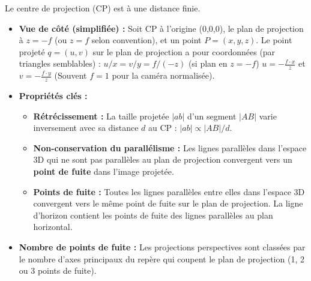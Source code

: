 \documentclass{article}
\begin{document}
Le centre de projection (CP) est à une distance finie.
\begin{itemize}
    \item \textbf{Vue de côté (simplifiée) :}
        Soit CP à l'origine (0,0,0), le plan de projection à $z = -f$ (ou $z=f$ selon convention), et un point $P=(x, y, z)$. Le point projeté $q=(u, v)$ sur le plan de projection a pour coordonnées (par triangles semblables) :
        $u / x = v / y = f / (-z)$ (si plan en $z=-f$)
        $u = - \frac{f \cdot x}{z}$ et $v = - \frac{f \cdot y}{z}$
        (Souvent $f=1$ pour la caméra normalisée).
    \item \textbf{Propriétés clés :}
        \begin{itemize}
            \item \textbf{Rétrécissement :} La taille projetée $|ab|$ d'un segment $|AB|$ varie inversement avec sa distance $d$ au CP : $|ab| \propto |AB|/d$.
            \item \textbf{Non-conservation du parallélisme :} Les lignes parallèles dans l'espace 3D qui ne sont pas parallèles au plan de projection convergent vers un \textbf{point de fuite} dans l'image projetée.
            \item \textbf{Points de fuite :} Toutes les lignes parallèles entre elles dans l'espace 3D convergent vers le même point de fuite sur le plan de projection. La ligne d'horizon contient les points de fuite des lignes parallèles au plan horizontal.
        \end{itemize}
    \item \textbf{Nombre de points de fuite :} Les projections perspectives sont classées par le nombre d'axes principaux du repère qui coupent le plan de projection (1, 2 ou 3 points de fuite).
\end{itemize}
\end{document}
